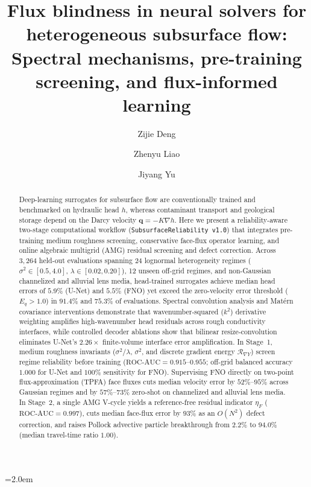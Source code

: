 \documentclass[preprint,12pt,authoryear]{elsarticle}
\begin{document}
\emergencystretch=2.0em

\begin{frontmatter}

\title{Flux blindness in neural solvers for heterogeneous subsurface flow: Spectral mechanisms, pre-training screening, and flux-informed learning}

\author[1]{Zijie Deng}
\author[2]{Zhenyu Liao}
\author[1]{Jiyang Yu}


\begin{abstract}
Deep-learning surrogates for subsurface flow are conventionally trained and benchmarked on hydraulic head $h$, whereas contaminant transport and geological storage depend on the Darcy velocity $\mathbf{q} = -K\nabla h$. Here we present a reliability-aware two-stage computational workflow (\texttt{SubsurfaceReliability v1.0}) that integrates pre-training medium roughness screening, conservative face-flux operator learning, and online algebraic multigrid (AMG) residual screening and defect correction. Across $3{,}264$ held-out evaluations spanning 24 lognormal heterogeneity regimes ($\sigma^2 \in [0.5, 4.0]$, $\lambda \in [0.02, 0.20]$), 12 unseen off-grid regimes, and non-Gaussian channelized and alluvial lens media, head-trained surrogates achieve median head errors of $5.9\%$ (U-Net) and $5.5\%$ (FNO) yet exceed the zero-velocity error threshold ($E_q > 1.0$) in $91.4\%$ and $75.3\%$ of evaluations. Spectral convolution analysis and Mat\'{e}rn covariance interventions demonstrate that wavenumber-squared ($k^2$) derivative weighting amplifies high-wavenumber head residuals across rough conductivity interfaces, while controlled decoder ablations show that bilinear resize-convolution eliminates U-Net's $2.26\times$ finite-volume interface error amplification. In Stage~1, medium roughness invariants ($\sigma^2/\lambda$, $\sigma^2$, and discrete gradient energy $\mathcal{R}_{\nabla Y}$) screen regime reliability before training ($\text{ROC-AUC} = 0.915$--$0.955$; off-grid balanced accuracy $1.000$ for U-Net and $100\%$ sensitivity for FNO). Supervising FNO directly on two-point flux-approximation (TPFA) face fluxes cuts median velocity error by $52\%$--$95\%$ across Gaussian regimes and by $57\%$--$73\%$ zero-shot on channelized and alluvial lens media. In Stage~2, a single AMG V-cycle yields a reference-free residual indicator $\eta_F$ ($\text{ROC-AUC} = 0.997$), cuts median face-flux error by $93\%$ as an $O(N^2)$ defect correction, and raises Pollock advective particle breakthrough from $2.2\%$ to $94.0\%$ (median travel-time ratio $1.00$).
\end{abstract}


\end{frontmatter}
\end{document}
